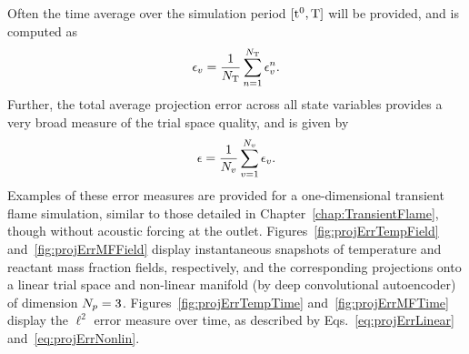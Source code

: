 Often the time average over the simulation period $[\text{t}^0, \text{T}]$ will be provided, and is computed as
%
\begin{equation}
    \epsilon_{v} = \frac{1}{N_{\text{T}}} \sum_{n = 1}^{N_{\text{T}}} \epsilon_{v}^{n}.
\end{equation}
%
Further, the total average projection error across all state variables provides a very broad measure of the trial space quality, and is given by
%
\begin{equation}
    \epsilon = \frac{1}{N_{v}} \sum_{v = 1}^{N_{v}} \epsilon_{v}.
\end{equation}
%
Examples of these error measures are provided for a one-dimensional transient flame simulation, similar to those detailed in Chapter~\ref{chap:TransientFlame}, though without acoustic forcing at the outlet. Figures~\ref{fig:projErrTempField} and~\ref{fig:projErrMFField} display instantaneous snapshots of temperature and reactant mass fraction fields, respectively, and the corresponding projections onto a linear trial space and non-linear manifold (by deep convolutional autoencoder) of dimension $N_p = 3$. Figures~\ref{fig:projErrTempTime} and~\ref{fig:projErrMFTime} display the $\ell^2$ error measure over time, as described by Eqs.~\ref{eq:projErrLinear} and~\ref{eq:projErrNonlin}.
%
